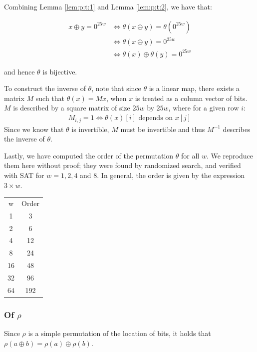 \documentclass[10pt,twocolumn,twoside]{pnas-new}
\begin{document}
Combining Lemma \ref{lem:p:t:1} and Lemma \ref{lem:p:t:2}, we have that:

\begin{align*}
    x \oplus y = 0^{25w} & \iff \theta(x \oplus y) = \theta(0^{25w}) \\
        & \iff \theta(x \oplus y) = 0^{25w} \\
        & \iff \theta(x) \oplus \theta(y) = 0^{25w}
\end{align*}

and hence $\theta$ is bijective.

To construct the inverse of $\theta$, note that since $\theta$ is a linear map,
there exists a matrix $M$ such that $\theta(x) = Mx$, when $x$ is treated as a
column vector of bits. $M$ is described by a square matrix of size $25w$ by
$25w$, where for a given row $i$:
\begin{align*}
    M_{i, j} = 1 \iff \theta(x)[i] \text{ depends on } x[j]
\end{align*}
Since we know that $\theta$ is invertible, $M$ must be invertible and thus
$M^{-1}$ describes the inverse of $\theta$.

Lastly, we have computed the order of the permutation $\theta$ for all $w$.
We reproduce them here without proof; they were found by randomized search, and
verified with SAT for $w = 1, 2, 4$ and $8$. In general, the order is given by
the expression $3 \times w$.

\begin{tabular}{c c} \label{tab:p:t:1}
    w & Order \\
    1 & 3 \\
    2 & 6 \\
    4 & 12 \\
    8 & 24 \\
    16 & 48 \\
    32 & 96 \\
    64 & 192 \\
\end{tabular}


\subsubsection{Of $\rho$} \label{sec:p:r}


Since $\rho$ is a simple permutation of the location of bits, it holds that
$\rho(a \oplus b) = \rho(a) \oplus \rho(b)$.
\end{document}

